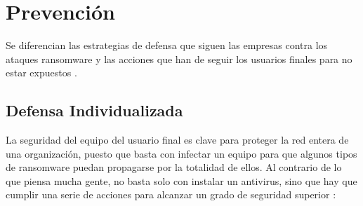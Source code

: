 \section{Prevención}\label{sec:2-9}

\noindent Se diferencian las estrategias de defensa que siguen las empresas contra los ataques ransomware y las acciones que han de seguir los usuarios finales para no estar expuestos \cite{ransommasive}.

\subsection{Defensa Individualizada}
\noindent La seguridad del equipo del usuario final es clave para proteger la red entera de una organización, puesto que basta con infectar un equipo para que algunos tipos de ransomware puedan propagarse por la totalidad de ellos. Al contrario de lo que piensa mucha gente, no basta solo con instalar un antivirus, sino que hay que cumplir una serie de acciones para alcanzar un grado de seguridad superior \cite{ransommasive}:
